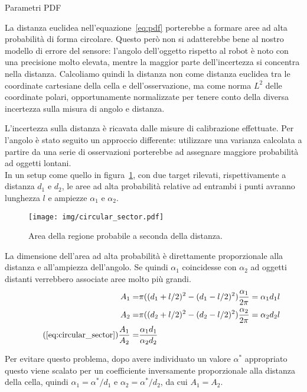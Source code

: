 \documentclass[10pt]{beamer}
\begin{document}
	\begin{frame}[allowframebreaks]{Parametri PDF}
	
	La distanza euclidea nell'equazione~\ref{eq:pdf} porterebbe a formare aree ad alta probabilità di forma
	circolare. Questo però non si adatterebbe bene al nostro modello di errore
	del sensore: l'angolo dell'oggetto rispetto al robot è noto con una
	precisione molto elevata, mentre la maggior parte dell'incertezza si
	concentra nella distanza. Calcoliamo quindi la distanza non come distanza
	euclidea tra le coordinate cartesiane della cella e dell'osservazione, ma
	come norma $L^2$ delle coordinate polari, opportunamente normalizzate per
	tenere conto della diversa incertezza sulla misura di angolo e distanza.
	
	\framebreak

	L'incertezza sulla distanza è ricavata dalle misure di calibrazione
	effettuate. Per l'angolo è stato seguito un approccio differente:
	utilizzare una varianza calcolata a partire da una serie di osservazioni
	porterebbe ad assegnare maggiore probabilità ad oggetti lontani. \\
	In un
	setup come quello in figura~\ref{fig:circular_sector}, con due target
	rilevati, rispettivamente a distanza $d_1$ e $d_2$, le aree ad alta
	probabilità relative ad entrambi i punti avranno lunghezza $l$ e ampiezze $
	\alpha_1 \text{ e } \alpha_2  $. 
	
	\begin{figure}[H]
		\centering
		\texttt{[image: img/circular\_sector.pdf]}
		\caption{Area della regione probabile a seconda della distanza.}
		\label{fig:circular_sector}
	\end{figure}

	La dimensione dell'area ad alta probabilità è direttamente
	proporzionale alla distanza e all'ampiezza dell'angolo. Se quindi $
	\alpha_1 $ coincidesse con $ \alpha _2 $ ad oggetti distanti verrebbero
	associate aree molto più grandi. 
	\begin{subequations}\label{eq:circular_sector}
	\begin{align*} 
		A_1  = & \pi((d_1+l/2)^2-(d_1-l/2)^2)\frac{\alpha_1}{2\pi}  =  \alpha_1 d_1l \\
		A_2  = & \pi((d_2+l/2)^2-(d_2-l/2)^2)\frac{\alpha_2}{2\pi}  =  \alpha_2 d_2l \\
\tag{\ref{eq:circular_sector}}
		\frac{A_1}{A_2} = & \frac	{\alpha_1 d_1} {\alpha_2 d_2}
	\end{align*}
	\end{subequations}
	
		
	Per evitare questo problema, dopo avere
	individuato un valore $ \alpha ^* $ appropriato questo viene scalato per un
	coefficiente inversamente proporzionale alla distanza della cella, quindi $
	\alpha _1 = \alpha ^*/d_1 $ e $ \alpha _2=\alpha ^*/d_2 $, da cui $A_1=A_2$. 
	
	\end{frame}
\end{document}
